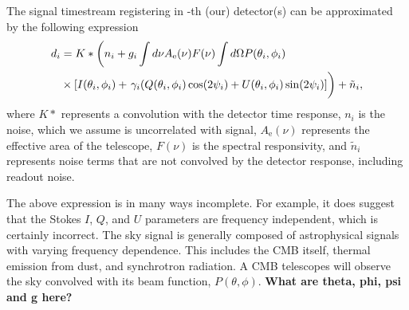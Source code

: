 The signal timestream registering in -th (our) detector(s) can be approximated by the following expression
\begin{equation}
\begin{split}
d _i &= K \ast \left( n_i + g_i \int d \nu A_\mathrm{e} (\nu) F(\nu) \int d\Omega P (\theta _i,\phi _i) \right. \\ 
&\times [I(\theta _i, \phi _i) + \left. \gamma _i (Q(\theta _i,\phi _i)\cos (2\psi _i) + U(\theta _i,\phi _i) \sin (2\psi _i) ]  \vphantom{\int } \right) + \tilde{n}_i,
\end{split}
\end{equation}
where $K \ast$ represents a convolution with the detector time response, $n_i$ is the noise, which we assume is uncorrelated with signal, $A_{\mathrm{e}} (\nu)$ represents the effective area of the telescope, $F(\nu)$ is the spectral responsivity, and $\tilde{n}_i$ represents noise terms that are not convolved by the detector response, including readout noise. 

The above expression is in many ways incomplete. For example, it does suggest that the Stokes $I$, $Q$, and $U$ parameters are frequency independent, which is certainly incorrect. The sky signal is generally composed of astrophysical signals with varying frequency dependence. This includes the CMB itself, thermal emission from dust, and synchrotron radiation. A CMB telescopes will observe the sky convolved with its beam function, $P(\theta, \phi)$. \textbf{What are theta, phi, psi and g here?}
